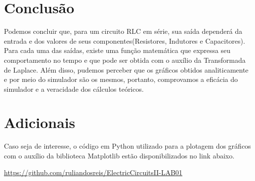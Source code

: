 \documentclass[12pt]{article}
\begin{document}
	\section{Conclusão}
	Podemos concluir que, para um circuito RLC em série, sua saída dependerá da entrada e dos valores de seus componentes(Resistores, Indutores e Capacitores). Para cada uma das saídas, existe uma função matemática que expressa seu comportamento no tempo e que pode ser obtida com o auxílio da Transformada de Laplace. Além disso, pudemos perceber que os gráficos obtidos analiticamente e por meio do simulador são os mesmos, portanto, comprovamos a eficácia do simulador e a veracidade dos cálculos teóricos.
	\section{Adicionais}
	Caso seja de interesse, o código em Python utilizado para a plotagem dos gráficos com o auxílio da biblioteca Matplotlib estão disponibilizados no link abaixo.
	\newline
	\begin{center}
		\url{https://github.com/ruliandosreis/ElectricCircuitsII-LAB01}
	\end{center}

	
	
	
\end{document}

